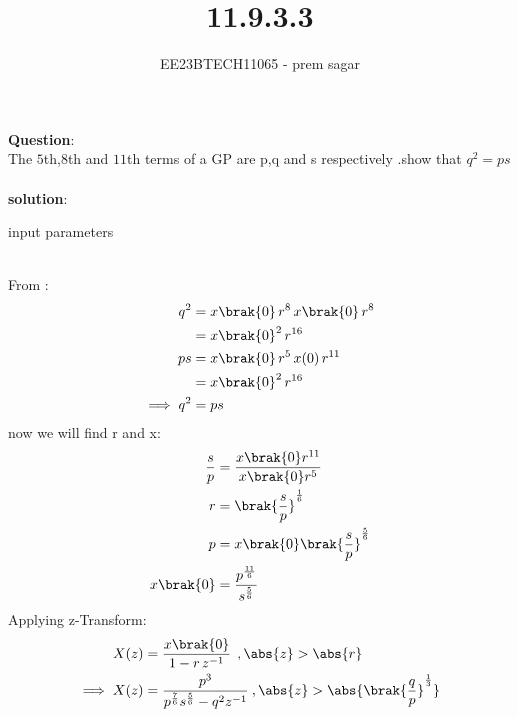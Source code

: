 \documentclass[journal,12pt,twocolumn]{IEEEtran}
\theoremstyle{remark}
\begin{document}

\vspace{3cm}

\title{11.9.3.3}
\author{EE23BTECH11065 - prem sagar}
\maketitle
\newpage

\bigskip 

\renewcommand{\thefigure}{\theenumi}
\renewcommand{\thetable}{\theenumi}
\textbf{Question}:\\ The $5$th,$8$th and $11$th terms of a GP are p,q and s respectively .show that $q^2=ps$
\\\\\textbf{solution}:
\fi
\begin{table}[!ht]
   \centering
    \renewcommand\thetable{1}
      
    \caption{input parameters}
    \label{tab:11.9.3}
 \end{table}
\\ From :
\begin{align}
q^2&=x\brak{0}\,r^8\,x\brak{0}\,r^8
     \\ &=x\brak{0}^2\,r^{16}
\\ps&=x\brak{0}\,r^5\,x(0)\,r^{11}
       \\&=x\brak{0}^2\,r^{16}
\\\implies q^2&=ps
\end{align}
now we will find r and x:
\begin{align}
\frac{s}{p}&=\frac{x\brak{0}r^{11}}{x\brak{0}r^5}
\\r&=\brak{\frac{s}{p}}^\frac{1}{6} 
\\p&=x\brak{0}\brak{\frac{s}{p}}^\frac{5}{6}
\\x\brak{0}&=\frac{p^\frac{11}{6}}{s^\frac{5}{6}}
\end{align}
Applying z-Transform:
\begin{align}
     X(z) &= \frac{x\brak{0}}{1-r\,z^{-1}}\: \:,\abs{z}>\abs{r}
\\ \implies  X(z)&=\frac{p^3}{p^\frac{7}{6}s^\frac{5}{6}-q^2z^{-1}}\:,\abs{z}>\abs{\brak{\frac{q}{p}}^\frac{1}{3}}
     \end{align}    
\end{document}
